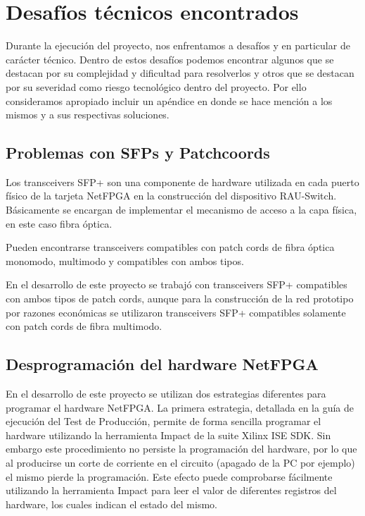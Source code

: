 
\chapter{Desaf\'ios t\'ecnicos encontrados}

\ifpdf
    \graphicspath{{Appendix2/Figs/Raster/}{Appendix2/Figs/PDF/}{Appendix2/Figs/}}
\else
    \graphicspath{{Appendix2/Figs/Vector/}{Appendix2/Figs/}}
\fi

Durante la ejecuci\'on del proyecto, nos enfrentamos a desaf\'ios y en particular de carácter t\'ecnico. Dentro de estos desaf\'ios podemos encontrar algunos que se destacan por su complejidad y dificultad para resolverlos y otros que se destacan por su severidad como riesgo tecnol\'ogico dentro del proyecto. Por ello consideramos apropiado incluir un ap\'endice en donde se hace menci\'on a los mismos y a sus respectivas soluciones.

\section{Problemas con SFPs y Patchcoords}

Los transceivers SFP+ son una componente de hardware utilizada en cada puerto f\'isico de la tarjeta NetFPGA en la construcci\'on del dispositivo RAU-Switch. Básicamente se encargan de implementar el mecanismo de acceso a la capa f\'isica, en este caso fibra \'optica.

Pueden encontrarse transceivers compatibles con patch cords de fibra \'optica monomodo, multimodo y compatibles con ambos tipos.

En el desarrollo de este proyecto se trabaj\'o con transceivers SFP+ compatibles con ambos tipos de patch cords, aunque para la construcci\'on de la red prototipo por razones econ\'omicas se utilizaron transceivers SFP+ compatibles solamente con patch cords de fibra multimodo.

\section{Desprogramaci\'on del hardware NetFPGA}
\label{apendiceB2}

En el desarrollo de este proyecto se utilizan dos estrategias diferentes para programar el hardware NetFPGA. La primera estrategia, detallada en la guía de ejecución del Test de Producción\citep{ProdTestManual}, permite de forma sencilla programar el hardware utilizando la herramienta Impact de la suite Xilinx ISE SDK. Sin embargo este procedimiento no persiste la programaci\'on del hardware, por lo que al producirse un corte de corriente en el circuito (apagado de la PC por ejemplo) el mismo pierde la programaci\'on. Este efecto puede comprobarse fácilmente utilizando la herramienta Impact para leer el valor de diferentes registros del hardware, los cuales indican el estado del mismo.

